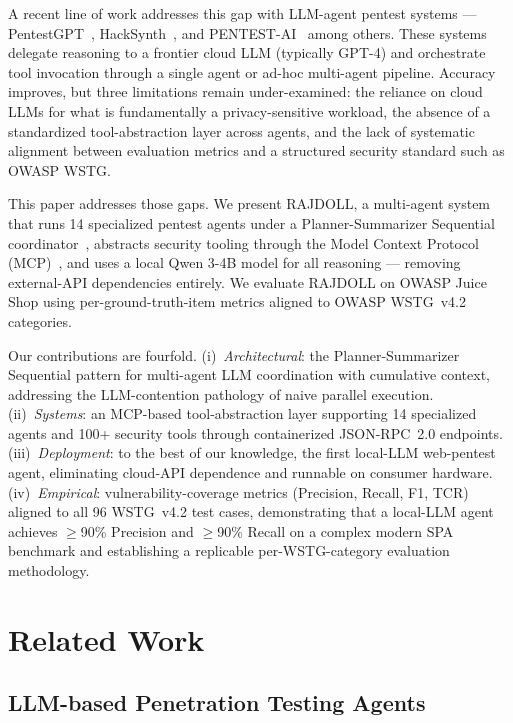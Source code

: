 \documentclass[conference]{IEEEtran}
\begin{document}
A recent line of work addresses this gap with LLM-agent pentest systems --- PentestGPT~\cite{pentestgpt}, HackSynth~\cite{hacksynth}, and PENTEST-AI~\cite{pentestai} among others. These systems delegate reasoning to a frontier cloud LLM (typically GPT-4) and orchestrate tool invocation through a single agent or ad-hoc multi-agent pipeline. Accuracy improves, but three limitations remain under-examined: the reliance on cloud LLMs for what is fundamentally a privacy-sensitive workload, the absence of a standardized tool-abstraction layer across agents, and the lack of systematic alignment between evaluation metrics and a structured security standard such as OWASP WSTG.

This paper addresses those gaps. We present RAJDOLL, a multi-agent system that runs 14 specialized pentest agents under a Planner-Summarizer Sequential coordinator~\cite{hacksynth}, abstracts security tooling through the Model Context Protocol (MCP)~\cite{mcp}, and uses a local Qwen 3-4B model for all reasoning --- removing external-API dependencies entirely. We evaluate RAJDOLL on OWASP Juice Shop using per-ground-truth-item metrics aligned to OWASP WSTG~v4.2 categories.

Our contributions are fourfold. (i)~\textit{Architectural}: the Planner-Summarizer Sequential pattern for multi-agent LLM coordination with cumulative context, addressing the LLM-contention pathology of naive parallel execution. (ii)~\textit{Systems}: an MCP-based tool-abstraction layer supporting 14 specialized agents and 100+ security tools through containerized JSON-RPC~2.0 endpoints. (iii)~\textit{Deployment}: to the best of our knowledge, the first local-LLM web-pentest agent, eliminating cloud-API dependence and runnable on consumer hardware. (iv)~\textit{Empirical}: vulnerability-coverage metrics (Precision, Recall, F1, TCR) aligned to all 96 WSTG~v4.2 test cases, demonstrating that a local-LLM agent achieves $\geq$90\% Precision and $\geq$90\% Recall on a complex modern SPA benchmark and establishing a replicable per-WSTG-category evaluation methodology.

\section{Related Work}

\subsection{LLM-based Penetration Testing Agents}
\end{document}
